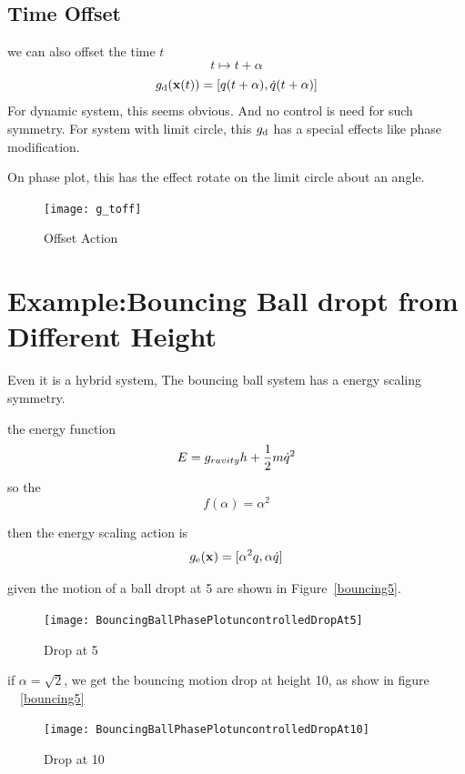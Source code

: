 \subsection*{Time Offset}
we can also offset the time $t$
\[
t \mapsto t+\alpha
\]
\[
g_{\mathrm{d}}(\mathbf{x}(t))=[q(t+\alpha),\dot{q}(t+\alpha)]
\]
For dynamic system, this seems obvious. And no control is need for such symmetry.
For system with limit circle, this $g_{\mathrm{d}}$ has a special effects like phase modification.

On phase plot, this has the effect rotate on the limit circle about an angle.
\begin{figure}[!htbp]
  \begin{center}
      \texttt{[image: g\_toff]}
    \caption{Offset Action}
    \label{fig:gtoff}
\end{center}
\end{figure}





\section{Example:Bouncing Ball dropt from Different Height}
Even it is a hybrid system,
The bouncing ball system has a energy scaling symmetry.

the energy function 
\[
E=g_{ravity}h+\frac{1}{2}m\dot{q}^2
\]
so the 
\[
f(\alpha)=\alpha^2
\]

then the energy scaling action is
\[
g_{\mathrm{e}}(\mathbf{x})=[\alpha^2 q, \alpha \dot{q}]
\]

given the motion of a ball dropt at 5 are shown in Figure~\ref{bouncing5}.


\begin{figure}[!htbp]
  \begin{center}
      \texttt{[image: BouncingBallPhasePlotuncontrolledDropAt5]}
    \caption{Drop at 5}
    \label{fig:bouncing5}
\end{center}
\end{figure}

if $\alpha=\sqrt{2}$, we get the bouncing motion drop at height 10, as show in figure ~~\ref{bouncing5}
\begin{figure}[!htbp]
  \begin{center}
      \texttt{[image: BouncingBallPhasePlotuncontrolledDropAt10]}
    \caption{Drop at 10}
    \label{fig:bouncing10}
\end{center}
\end{figure}


